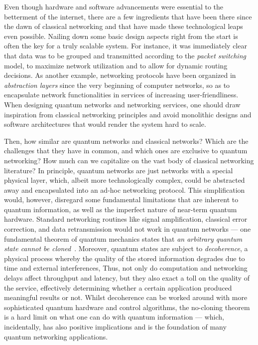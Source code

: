 \begin{refsection}
Even though hardware and software advancements were essential to the betterment of the internet,
there are a few ingredients that have been there since the dawn of classical networking and that
have made these technological leaps even possible. Nailing down some basic design aspects right from
the start is often the key for a truly scalable system. For instance, it was immediately clear that
data was to be grouped and transmitted according to the \emph{packet switching} model, to maximize
network utilization and to allow for dynamic routing decisions. As another example, networking
protocols have been organized in \emph{abstraction layers} since the very beginning of computer
networks, so as to encapsulate network functionalities in services of increasing user-friendliness.
When designing quantum networks and networking services, one should draw inspiration from classical
networking principles and avoid monolithic designs and software architectures that would render the
system hard to scale.

Then, how similar are quantum networks and classical networks? Which are the challenges that they
have in common, and which ones are exclusive to quantum networking? How much can we capitalize on
the vast body of classical networking literature? In principle, quantum networks are just networks
with a special physical layer, which, albeit more technologically complex, could be abstracted away
and encapsulated into an ad-hoc networking protocol. This simplification would, however, disregard
some fundamental limitations that are inherent to quantum information, as well as the imperfect
nature of near-term quantum hardware. Standard networking routines like signal amplification,
classical error correction, and data retransmission would not work in quantum networks --- one
fundamental theorem of quantum mechanics states that \emph{an arbitrary quantum state cannot be
cloned}~\cite{wootters_nocloning_1982, dieks_communication_1982}. Moreover, quantum states are
subject to \emph{decoherence}, a physical process whereby the quality of the stored information
degrades due to time and external interferences, Thus, not only do computation and networking delays
affect throughput and latency, but they also exact a toll on the quality of the service, effectively
determining whether a certain application produced meaningful results or not. Whilst decoherence can
be worked around with more sophisticated quantum hardware and control algorithms, the no-cloning
theorem is a hard limit on what one can do with quantum information --- which, incidentally, has
also positive implications and is the foundation of many quantum networking applications.


\end{refsection}
